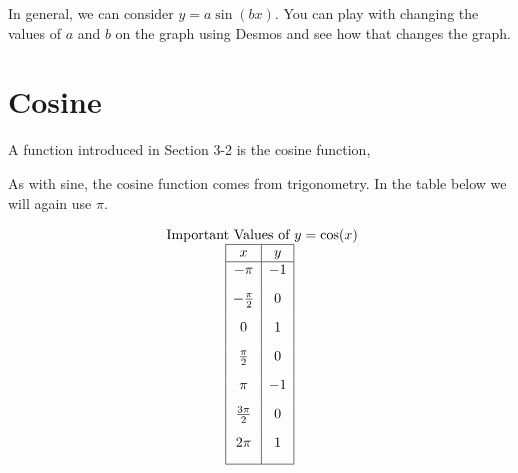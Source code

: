 \documentclass[nooutcomes]{ximera}
\begin{document}
In general, we can consider $y=a\sin(bx)$.  You can play with changing the values of $a$ and $b$ on the graph using Desmos and see how that changes the graph. 
 
\begin{center} 
\end{center}
 
 
 
\newpage
 
 
\section{Cosine}
A function introduced in Section 3-2 is the cosine function,
 
\begin{center}
\end{center}
 
 
As with sine, the cosine function comes from trigonometry. In the table below we will again use $\pi$.
 
\begin{center}
\end{center}
 
\[
\begin{array}{ c }
 \text{ Important Values of  $y=\cos(x)$}\\
\begin{array}{|c|c|}
 \hline
 x & y\\
 \hline
 -\pi&-1\\[2ex]
 -\frac{\pi}{2}&0\\[2ex]
 0&1\\[2ex]
 \frac{\pi}{2}&0\\[2ex]
 \pi&-1\\[2ex]
\frac{3\pi}{2}&0\\[2ex]
 2 \pi&1\\[2ex]
\hline
\end{array}
\end{array}
\]
 
\end{document}
